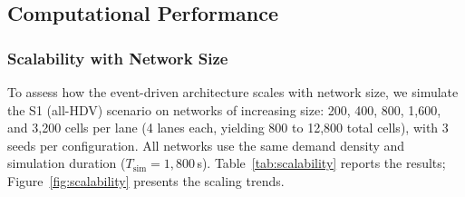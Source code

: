 \documentclass[review,authoryear]{elsarticle}
\begin{document}
\subsection{Computational Performance}
\label{sec:exp_performance_new}

\subsubsection{Scalability with Network Size}
\label{sec:exp_scalability}

To assess how the event-driven architecture scales with network size, we simulate the S1 (all-HDV) scenario on networks of increasing size: 200, 400, 800, 1{,}600, and 3{,}200 cells per lane (4 lanes each, yielding 800 to 12{,}800 total cells), with 3 seeds per configuration. All networks use the same demand density and simulation duration ($T_{\text{sim}} = 1{,}800$\,s). Table~\ref{tab:scalability} reports the results; Figure~\ref{fig:scalability} presents the scaling trends.
\end{document}
